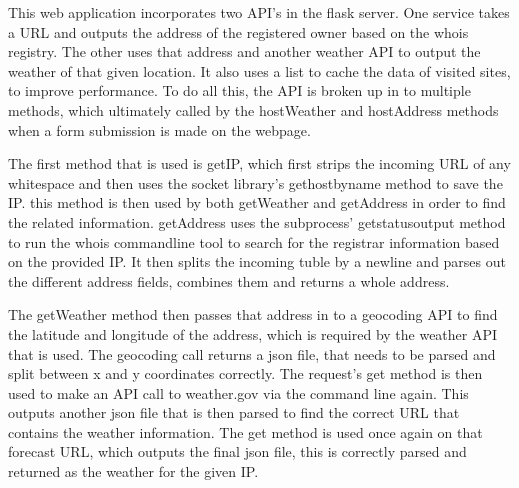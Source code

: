 	This web application incorporates two API's in the flask server. One service takes a URL and outputs the address of the registered owner based on the whois registry. The other uses that address and another weather API to output the weather of that given location. It also uses a list to cache the data of visited sites, to improve performance. To do all this, the API is broken up in to multiple methods, which ultimately called by the hostWeather and hostAddress methods when a form submission is made on the webpage.
	
	The first method that is used is getIP, which first strips the incoming URL of any whitespace and then uses the socket library's gethostbyname method to save the IP. this method is then used by both getWeather and getAddress in order to find the related information. getAddress uses the subprocess' getstatusoutput method to run the whois commandline tool to search for the registrar information based on the provided IP. It then splits the incoming tuble by a newline and parses out the different address fields, combines them and returns a whole address. 
	
	The getWeather method then passes that address in to a geocoding API to find the latitude and longitude of the address, which is required by the weather API that is used. The geocoding call returns a json file, that needs to be parsed and split between x and y coordinates correctly. The request's get method is then used to make an API call to weather.gov via the command line again. This outputs another json file that is then parsed to find the correct URL that contains the weather information. The get method is used once again on that forecast URL, which outputs the final json file, this is correctly parsed and returned as the weather for the given IP.
	 
